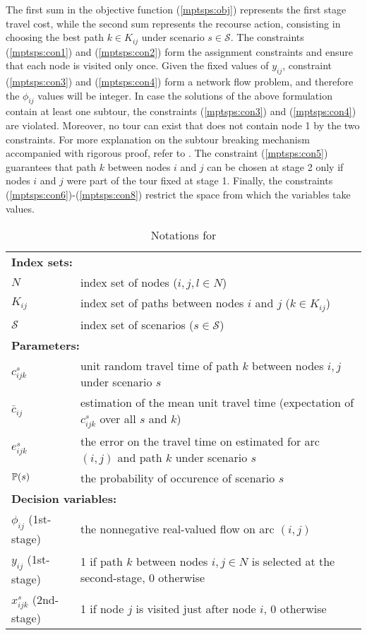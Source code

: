 The first sum in the objective function (\ref{mptsps:obj}) represents the first stage travel cost, while the second sum represents the recourse action, consisting in choosing the best path $k\in K_{ij}$ under scenario $s\in\mathcal{S}$. The constraints (\ref{mptsps:con1}) and (\ref{mptsps:con2}) form the assignment constraints and ensure that each node is visited only once. Given the fixed values of $y_{ij}$, constraint (\ref{mptsps:con3}) and (\ref{mptsps:con4}) form a network flow problem, and therefore the $\phi_{ij}$ values will be integer. In case the solutions of the above formulation contain at least one subtour, the constraints (\ref{mptsps:con3}) and (\ref{mptsps:con4}) are violated. Moreover, no tour can exist that does not contain node 1 by the two constraints. For more explanation on the subtour breaking mechanism accompanied with rigorous proof, refer to \cite{GG1978}. The constraint (\ref{mptsps:con5}) guarantees that path $k$ between nodes $i$ and $j$ can be chosen at stage 2 only if nodes $i$ and $j$ were part of the tour fixed at stage 1. Finally, the constraints (\ref{mptsps:con6})-(\ref{mptsps:con8}) restrict the space from which the variables take values.

\begin{table}[H]
	\caption{Notations for \mptsps}
	\label{mptsps:notation}
	\resizebox{\textwidth}{!}
	{
		\begin{tabular}{ll}
			\toprule
			\multicolumn{2}{l}{\textbf{Index sets:}} \\
			$N$ & \textrm{index set of nodes ($i,j,l\in N$)} \\ 
			$K_{ij}$ & \textrm{index set of paths between nodes $i$ and $j$ ($k\in K_{ij}$)} \\ 
			$\mathcal{S}$ & \textrm{index set of scenarios ($s\in \mathcal{S}$)}\\ \midrule
			\multicolumn{2}{l}{\textbf{Parameters:}} \\
			$c_{ijk}^{s}$ & \textrm{unit random travel time of path $k$ between nodes $i,j$ under scenario $s$} \\ 
			$\bar{c}_{ij}$ & \textrm{estimation of the mean unit travel time (expectation of $c_{ijk}^{s}$ over all $s$ and $k$)} \\ 
			$e_{ijk}^{s}$ & \textrm{the error on the travel time on estimated for arc $(i,j)$ and path $k$ under scenario $s$} \\ 
			$\operatorname*{\mathbb{P}}(s)$ & \textrm{the probability of occurence of scenario $s$} \\  \midrule
			\multicolumn{2}{l}{\textbf{Decision variables:}} \\
			$\phi_{ij}$ (1st-stage) & \textrm{the nonnegative real-valued flow on arc $(i,j)$}\\
			$y_{ij}$ (1st-stage)& \textrm{1 if path $k$ between nodes $i,j\in N$ is selected at the second-stage, 0 otherwise} \\  
			$x_{ijk}^{s}$ (2nd-stage) & \textrm{1 if node $j$ is visited just after node $i$, 0 otherwise} \\ 
			\bottomrule
		\end{tabular}
	}
\end{table} 



